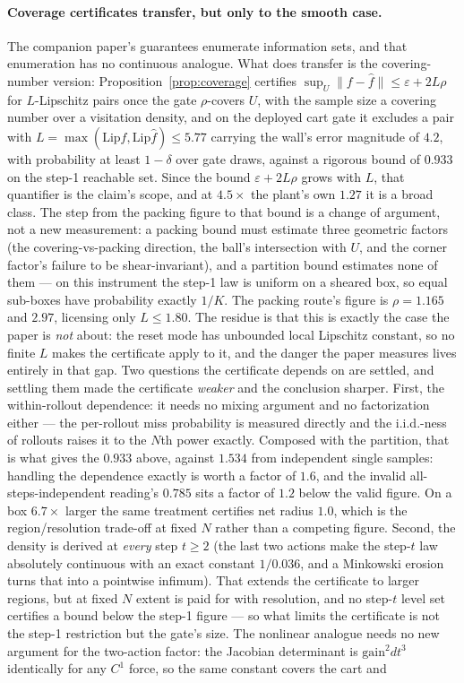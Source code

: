 \documentclass[11pt]{article}
\theoremstyle{definition}
\theoremstyle{remark}
\begin{document}
\paragraph{Coverage certificates transfer, but only to the smooth case.} The companion paper's guarantees enumerate information sets, and that enumeration has no continuous analogue. What does transfer is the covering-number version: Proposition~\ref{prop:coverage} certifies $\sup_U \|f - \hat f\| \leq \varepsilon + 2L\rho$ for $L$-Lipschitz pairs once the gate $\rho$-covers $U$, with the sample size a covering number over a visitation density, and on the deployed cart gate it excludes a pair with $L = \max(\mathrm{Lip} f, \mathrm{Lip}\hat f) \leq 5.77$ carrying the wall's error magnitude of $4.2$, with probability at least $1-\delta$ over gate draws, against a rigorous bound of $0.933$ on the step-1 reachable set. Since the bound $\varepsilon + 2L\rho$ grows with $L$, that quantifier is the claim's scope, and at $4.5\times$ the plant's own $1.27$ it is a broad class. The step from the packing figure to that bound is a change of argument, not a new measurement: a packing bound must estimate three geometric factors (the covering-vs-packing direction, the ball's intersection with $U$, and the corner factor's failure to be shear-invariant), and a partition bound estimates none of them --- on this instrument the step-1 law is uniform on a sheared box, so equal sub-boxes have probability exactly $1/K$. The packing route's figure is $\rho = 1.165$ and $2.97$, licensing only $L \leq 1.80$. The residue is that this is exactly the case the paper is \emph{not} about: the reset mode has unbounded local Lipschitz constant, so no finite $L$ makes the certificate apply to it, and the danger the paper measures lives entirely in that gap. Two questions the certificate depends on are settled, and settling them made the certificate \emph{weaker} and the conclusion sharper. First, the within-rollout dependence: it needs no mixing argument and no factorization either --- the per-rollout miss probability is measured directly and the i.i.d.-ness of rollouts raises it to the $N$th power exactly. Composed with the partition, that is what gives the $0.933$ above, against $1.534$ from independent single samples: handling the dependence exactly is worth a factor of $1.6$, and the invalid all-steps-independent reading's $0.785$ sits a factor of $1.2$ below the valid figure. On a box $6.7\times$ larger the same treatment certifies net radius $1.0$, which is the region/resolution trade-off at fixed $N$ rather than a competing figure. Second, the density is derived at \emph{every} step $t \geq 2$ (the last two actions make the step-$t$ law absolutely continuous with an exact constant $1/0.036$, and a Minkowski erosion turns that into a pointwise infimum). That extends the certificate to larger regions, but at fixed $N$ extent is paid for with resolution, and no step-$t$ level set certifies a bound below the step-1 figure --- so what limits the certificate is not the step-1 restriction but the gate's size. The nonlinear analogue needs no new argument for the two-action factor: the Jacobian determinant is $\mathrm{gain}^2 dt^3$ identically for any $C^1$ force, so the same constant covers the cart and 
\end{document}
